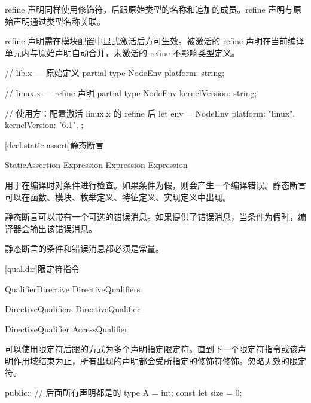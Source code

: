 \pnum
refine 声明同样使用修饰符，后跟原始类型的名称和追加的成员。refine 声明与原始声明通过类型名称关联。

\pnum
refine 声明需在模块配置中显式激活后方可生效。被激活的 refine 声明在当前编译单元内与原始声明自动合并，未激活的 refine 不影响类型定义。

\enterexample
\begin{codeblock}
// lib.x — 原始定义
partial type NodeEnv {
    platform: string;
}

// linux.x — refine 声明
partial type NodeEnv {
    kernelVersion: string;
}

// 使用方：配置激活 linux.x 的 refine 后
let env = NodeEnv {
    platform: "linux",
    kernelVersion: "6.1",
};
\end{codeblock}
\exitexample

[decl.static-assert]{静态断言}

\begin{bnf}{StaticAssertion}
      Expression \terminal{;} \br
      Expression \terminal{:} Expression \terminal{;}
\end{bnf}

\pnum
{}用于在编译时对条件进行检查。如果条件为假，则会产生一个编译错误。静态断言可以在函数、模块、枚举定义、特征定义、实现定义中出现。

\pnum
静态断言可以带有一个可选的错误消息。如果提供了错误消息，当条件为假时，编译器会输出该错误消息。

\pnum
静态断言的条件和错误消息都必须是常量。

[qual.dir]{限定符指令}

\begin{bnf}{QualifierDirective}
    DirectiveQualifiers \terminal{::}
\end{bnf}

\begin{bnf}{DirectiveQualifiers}
    DirectiveQualifier\bnfp
\end{bnf}

\begin{bnf}{DirectiveQualifier}
    AccessQualifier
\end{bnf}

\pnum
可以使用限定符后跟\tcode{::}的方式为多个声明指定限定符。直到下一个限定符指令或该声明作用域结束为止，所有出现的声明都会受所指定的修饰符修饰。忽略无效的限定符。

\enterexample
\begin{codeblock}
public:: // 后面所有声明都是的
type A = int;
const let size = 0;
\end{codeblock}